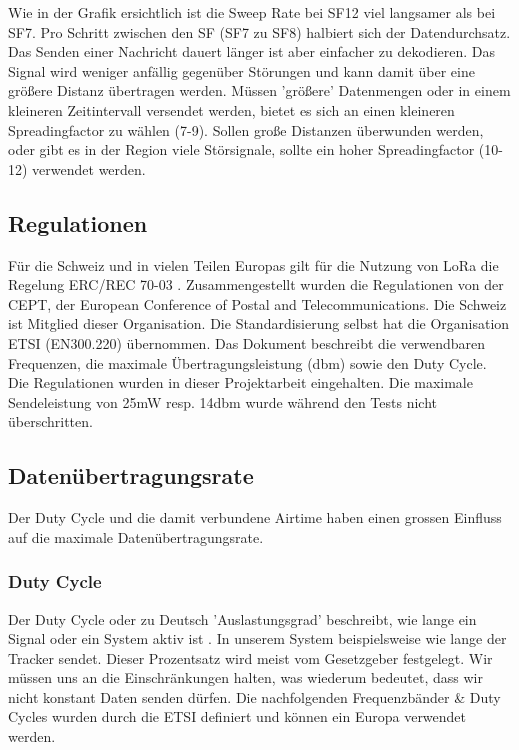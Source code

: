 \documentclass[11pt,english,german]{report}
\theoremstyle{definition}
\begin{document}
\noindent
Wie in der Grafik ersichtlich ist die Sweep Rate bei SF12 viel langsamer als bei SF7. Pro Schritt zwischen den SF (SF7 zu SF8) halbiert sich der Datendurchsatz. Das Senden einer Nachricht dauert länger ist aber einfacher zu dekodieren. Das Signal wird weniger anfällig gegenüber Störungen und kann damit über eine größere Distanz übertragen werden. Müssen 'größere' Datenmengen oder in einem kleineren Zeitintervall versendet werden, bietet es sich an einen kleineren Spreadingfactor zu wählen (7-9).  Sollen große Distanzen überwunden werden, oder gibt es in der Region viele Störsignale, sollte ein hoher Spreadingfactor (10-12) verwendet werden.

\newpage
\subsection{Regulationen}
Für die Schweiz und in vielen Teilen Europas gilt für die Nutzung von LoRa die Regelung ERC/REC 70-03 \cite{regulations}. Zusammengestellt wurden die Regulationen von der CEPT, der European Conference of Postal and Telecommunications. Die Schweiz ist Mitglied dieser Organisation. Die Standardisierung selbst hat die Organisation ETSI (EN300.220) übernommen. Das Dokument beschreibt die verwendbaren Frequenzen, die maximale Übertragungsleistung (dbm) sowie den Duty Cycle.\\[0.3cm]
Die Regulationen wurden in dieser Projektarbeit eingehalten. Die maximale Sendeleistung von 25mW resp. 14dbm wurde während den Tests nicht überschritten.

\subsection{Datenübertragungsrate}
Der Duty Cycle und die damit verbundene Airtime haben einen grossen Einfluss auf die maximale Datenübertragungsrate. 
\subsubsection{Duty Cycle}
Der Duty Cycle oder zu Deutsch 'Auslastungsgrad' beschreibt, wie lange ein Signal oder ein System aktiv ist \cite{wikiduty}. In unserem System beispielsweise wie lange der Tracker sendet. Dieser Prozentsatz wird meist vom Gesetzgeber festgelegt. Wir müssen uns an die Einschränkungen halten, was wiederum bedeutet, dass wir nicht konstant Daten senden dürfen. Die nachfolgenden Frequenzbänder \& Duty Cycles wurden durch die ETSI definiert und können ein Europa verwendet werden\cite{lorawanfreq}.
\end{document}
